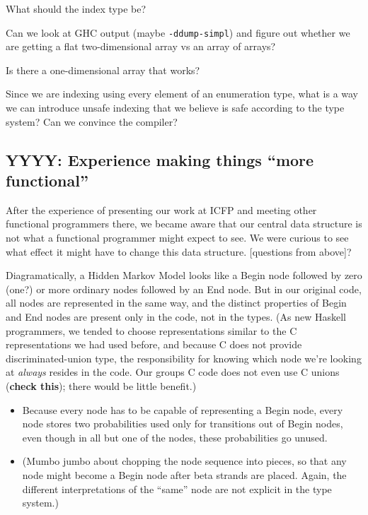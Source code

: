 \begin{enumerate}[1.]
\begin{itemize}
    What should the index type be?

    Can we look at GHC output (maybe \texttt{-ddump-simpl}) and figure
    out whether we are getting a flat two-dimensional array vs an array
    of arrays?

    Is there a one-dimensional array that works?

    Since we are indexing using every element of an enumeration type,
    what is a way we can introduce unsafe indexing that we believe is
    safe according to the type system? Can we convince the compiler?
  \end{itemize}
\end{enumerate}

\subsection{YYYY: Experience making things ``more functional''}

After the experience of presenting our work at ICFP and meeting other
functional programmers there, we became aware that our central data
structure is not what a functional programmer might expect to see. We
were curious to see what effect it might have to change this data
structure. {[}questions from above{]}?

Diagramatically, a Hidden Markov Model looks like a Begin node followed
by zero (one?) or more ordinary nodes followed by an End node. But in
our original code, all nodes are represented in the same way, and the
distinct properties of Begin and End nodes are present only in the code,
not in the types. (As new Haskell programmers, we tended to choose
representations similar to the C representations we had used before, and
because C does not provide discriminated-union type, the responsibility
for knowing which node we're looking at \emph{always} resides in the
code. Our groups C code does not even use C unions (\textbf{check
this}); there would be little benefit.)

\begin{itemize}
\item
  Because every node has to be capable of representing a Begin node,
  every node stores two probabilities used only for transitions out of
  Begin nodes, even though in all but one of the nodes, these
  probabilities go unused.
\item
  (Mumbo jumbo about chopping the node sequence into pieces, so that any
  node might become a Begin node after beta strands are placed. Again,
  the different interpretations of the ``same'' node are not explicit in
  the type system.)
\end{itemize}

